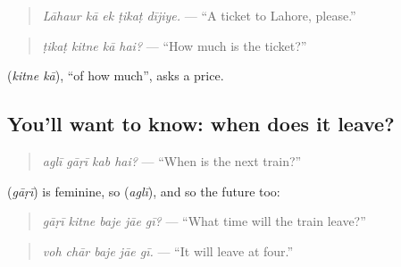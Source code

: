 \begin{quote}
\textbf{    }
\end{quote}

\begin{quote}
\emph{Lāhaur kā ek ṭikaṭ dījiye.} — \textquotedblleft{}A ticket to Lahore, please.\textquotedblright{}
\end{quote}

\begin{quote}
\textbf{   }
\end{quote}

\begin{quote}
\emph{ṭikaṭ kitne kā hai?} — \textquotedblleft{}How much is the ticket?\textquotedblright{}
\end{quote}

\textbf{ } (\emph{kitne kā}), \textquotedblleft{}of how much\textquotedblright{}, asks a price.

\subsection*{You'll want to know: when does it leave?}
\begin{quote}
\textbf{   }
\end{quote}

\begin{quote}
\emph{aglī gāṛī kab hai?} — \textquotedblleft{}When is the next train?\textquotedblright{}
\end{quote}

\textbf{} (\emph{gāṛī}) is feminine, so \textbf{} (\emph{aglī}), and so the future too:

\begin{quote}
\textbf{    }
\end{quote}

\begin{quote}
\emph{gāṛī kitne baje jāe gī?} — \textquotedblleft{}What time will the train leave?\textquotedblright{}
\end{quote}

\begin{quote}
\textbf{    }
\end{quote}

\begin{quote}
\emph{voh chār baje jāe gī.} — \textquotedblleft{}It will leave at four.\textquotedblright{}
\end{quote}

